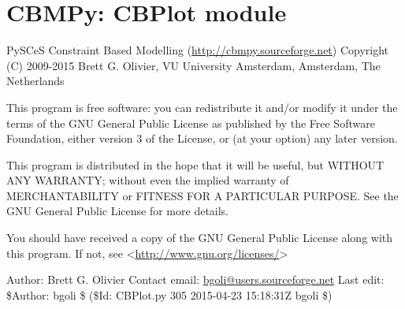 \documentclass[a4paper,11pt,english]{sphinxmanual}
\begin{document}
\label{modules_doc:module-cbmpy.CBPlot}

\section{CBMPy: CBPlot module}
\label{modules_doc:cbmpy-cbplot-module}
PySCeS Constraint Based Modelling (\href{http://cbmpy.sourceforge.net}{http://cbmpy.sourceforge.net})
Copyright (C) 2009-2015 Brett G. Olivier, VU University Amsterdam, Amsterdam, The Netherlands

This program is free software: you can redistribute it and/or modify
it under the terms of the GNU General Public License as published by
the Free Software Foundation, either version 3 of the License, or
(at your option) any later version.

This program is distributed in the hope that it will be useful,
but WITHOUT ANY WARRANTY; without even the implied warranty of
MERCHANTABILITY or FITNESS FOR A PARTICULAR PURPOSE.  See the
GNU General Public License for more details.

You should have received a copy of the GNU General Public License
along with this program.  If not, see \textless{}\href{http://www.gnu.org/licenses/}{http://www.gnu.org/licenses/}\textgreater{}

Author: Brett G. Olivier
Contact email: \href{mailto:bgoli@users.sourceforge.net}{bgoli@users.sourceforge.net}
Last edit: \$Author: bgoli \$ (\$Id: CBPlot.py 305 2015-04-23 15:18:31Z bgoli \$)
\end{document}

